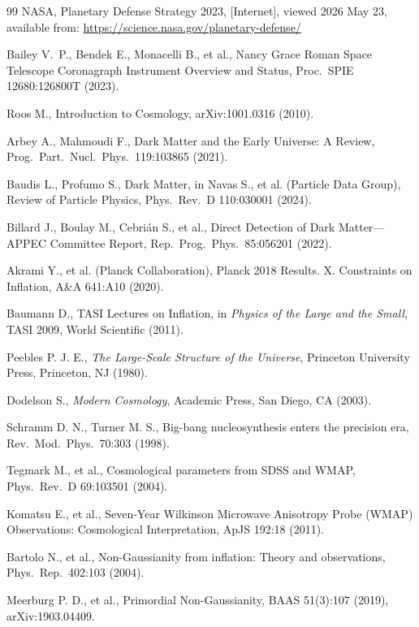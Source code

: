 \begin{thebibliography}{99}
NASA, Planetary Defense Strategy 2023, [Internet], viewed 2026 May 23, available from: \url{https://science.nasa.gov/planetary-defense/}

Bailey V.~P., Bendek E., Monacelli B., et al.,
Nancy Grace Roman Space Telescope Coronagraph Instrument Overview and Status,
Proc.\ SPIE 12680:126800T (2023).

Roos M., Introduction to Cosmology, arXiv:1001.0316 (2010).

Arbey A., Mahmoudi F., Dark Matter and the Early Universe: A Review, Prog.\ Part.\ Nucl.\ Phys.\ 119:103865 (2021).

Baudis L., Profumo S., Dark Matter, in Navas S., et al. (Particle Data Group),
Review of Particle Physics, Phys.\ Rev.\ D 110:030001 (2024).

Billard J., Boulay M., Cebri\'{a}n S., et al., Direct Detection of Dark Matter---APPEC Committee Report, Rep.\ Prog.\ Phys.\ 85:056201 (2022).

Akrami Y., et al. (Planck Collaboration), Planck 2018 Results. X. Constraints on Inflation, A\&A 641:A10 (2020).

Baumann D., TASI Lectures on Inflation, in \textit{Physics of the Large and the Small}, TASI 2009, World Scientific (2011).

Peebles P. J. E., \textit{The Large-Scale Structure of the Universe}, Princeton University Press, Princeton, NJ (1980).

Dodelson S., \textit{Modern Cosmology}, Academic Press, San Diego, CA (2003).

Schramm D. N., Turner M. S., Big-bang nucleosynthesis enters the precision era, Rev.\ Mod.\ Phys.\ 70:303 (1998).

Tegmark M., et al., Cosmological parameters from SDSS and WMAP, Phys.\ Rev.\ D 69:103501 (2004).

Komatsu E., et al., Seven-Year Wilkinson Microwave Anisotropy Probe (WMAP) Observations: Cosmological Interpretation, ApJS 192:18 (2011).

Bartolo N., et al., Non-Gaussianity from inflation: Theory and observations, Phys.\ Rep.\ 402:103 (2004).

Meerburg P. D., et al., Primordial Non-Gaussianity, BAAS 51(3):107 (2019), arXiv:1903.04409.


\end{thebibliography}
